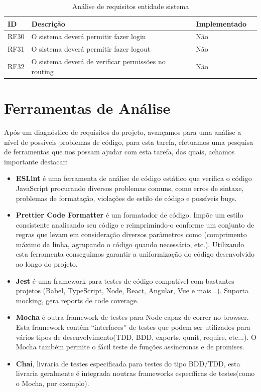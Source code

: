 \documentclass[a4paper,12pt]{article} %
\begin{document}
\begin{table}[H]
	\centering
	\begin{tabular}{|l|p{12cm}|l|r|}
		\hline
		\textbf{ID} & \textbf{Descrição} & \textbf{Implementado}\\
		\hline
		RF30 & O sistema deverá permitir fazer login & Não \\
		\hline
		RF31 & O sistema deverá permitir fazer logout & Não \\
		\hline
		RF32 & O sistema deverá de verificar permissões no routing & Não \\
		\hline
	\end{tabular}
	\caption{Análise de requisitos entidade sistema}
\end{table}

\newpage
\section{Ferramentas de Análise}
Após um diagnóstico de requisitos do projeto, avançamos para uma análise a nível de possíveis problemas de código, para esta tarefa, efetuamos uma pesquisa de ferramentas que nos possam ajudar com esta tarefa, das quais, achamos importante destacar:

\begin{itemize}
	\item \textbf{ESLint} é uma ferramenta de análise de código estático que verifica o código JavaScript procurando diversos problemas comuns, como erros de sintaxe, problemas de formatação, violações de estilo de código e possíveis bugs.

	\item \textbf{Prettier Code Formatter} é um formatador de código. Impõe um estilo consistente analisando seu código e reimprimindo-o conforme um conjunto de regras que levam em consideração diversos parâmetros como (comprimento máximo da linha, agrupando o código quando necessário, etc.). Utilizando esta ferramenta conseguimos garantir a uniformização do código desenvolvido ao longo do projeto.

	\item \textbf{Jest} é uma framework para testes de código compatível com bastantes projetos (Babel, TypeScript, Node, React, Angular, Vue e mais...). Suporta mocking, gera reports de code coverage.

	\item \textbf{Mocha} é outra framework de testes para Node capaz de correr no browser. Esta framework contém “interfaces” de testes que podem ser utilizados para vários tipos de desenvolvimento(TDD, BDD, exports, qunit, require, etc...). O Mocha também permite o fácil teste de funções assíncronas e de promises.

	\item \textbf{Chai}, livraria de testes especificada para testes do tipo BDD/TDD, esta livraria geralmente é integrada noutras frameworks específicas de testes(como o Mocha, por exemplo).
\end{itemize}
\end{document}
